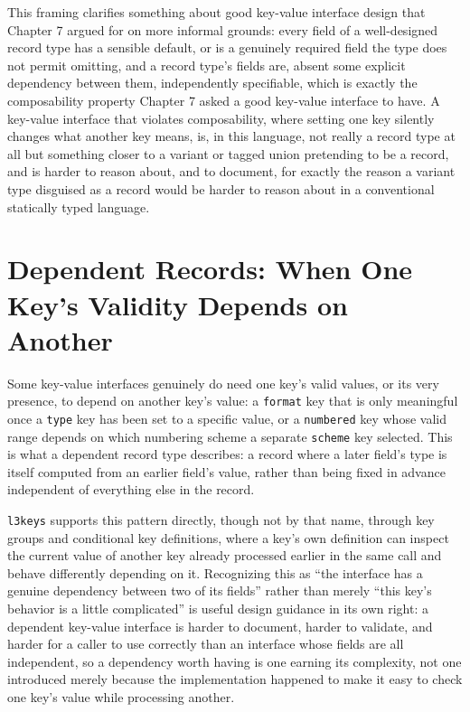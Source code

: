This framing clarifies something about good key-value interface design that Chapter 7 argued for on more informal grounds: every field of a well-designed record type has a sensible default, or is a genuinely required field the type does not permit omitting, and a record type's fields are, absent some explicit dependency between them, independently specifiable, which is exactly the composability property Chapter 7 asked a good key-value interface to have. A key-value interface that violates composability, where setting one key silently changes what another key means, is, in this language, not really a record type at all but something closer to a variant or tagged union pretending to be a record, and is harder to reason about, and to document, for exactly the reason a variant type disguised as a record would be harder to reason about in a conventional statically typed language.

\hypertarget{c.4-dependent-records-when-one-keys-validity-depends-on-another}{%
\section{Dependent Records: When One Key's Validity Depends on Another}\label{c.4-dependent-records-when-one-keys-validity-depends-on-another}}

Some key-value interfaces genuinely do need one key's valid values, or its very presence, to depend on another key's value: a \texttt{format} key that is only meaningful once a \texttt{type} key has been set to a specific value, or a \texttt{numbered} key whose valid range depends on which numbering scheme a separate \texttt{scheme} key selected. This is what a dependent record type describes: a record where a later field's type is itself computed from an earlier field's value, rather than being fixed in advance independent of everything else in the record.

\texttt{l3keys} supports this pattern directly, though not by that name, through key groups and conditional key definitions, where a key's own definition can inspect the current value of another key already processed earlier in the same call and behave differently depending on it. Recognizing this as ``the interface has a genuine dependency between two of its fields'' rather than merely ``this key's behavior is a little complicated'' is useful design guidance in its own right: a dependent key-value interface is harder to document, harder to validate, and harder for a caller to use correctly than an interface whose fields are all independent, so a dependency worth having is one earning its complexity, not one introduced merely because the implementation happened to make it easy to check one key's value while processing another.

